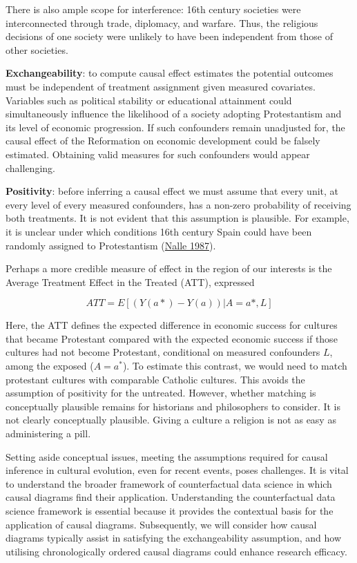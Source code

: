 \documentclass[
  singlecolumn]{report}
\begin{document}
There is also ample scope for interference: 16th century societies were
interconnected through trade, diplomacy, and warfare. Thus, the
religious decisions of one society were unlikely to have been
independent from those of other societies.

\textbf{Exchangeability}: to compute causal effect estimates the
potential outcomes must be independent of treatment assignment given
measured covariates. Variables such as political stability or
educational attainment could simultaneously influence the likelihood of
a society adopting Protestantism and its level of economic progression.
If such confounders remain unadjusted for, the causal effect of the
Reformation on economic development could be falsely estimated.
Obtaining valid measures for such confounders would appear challenging.

\textbf{Positivity}: before inferring a causal effect we must assume
that every unit, at every level of every measured confounders, has a
non-zero probability of receiving both treatments. It is not evident
that this assumption is plausible. For example, it is unclear under
which conditions 16th century Spain could have been randomly assigned to
Protestantism (\protect\hyperlink{ref-nalle1987}{Nalle 1987}).

Perhaps a more credible measure of effect in the region of our interests
is the Average Treatment Effect in the Treated (ATT), expressed

\[ATT = E[(Y(a*)- Y(a))|A = a*,L]\]

Here, the ATT defines the expected difference in economic success for
cultures that became Protestant compared with the expected economic
success if those cultures had not become Protestant, conditional on
measured confounders \(L\), among the exposed (\(A = a^*\)). To estimate
this contrast, we would need to match protestant cultures with
comparable Catholic cultures. This avoids the assumption of positivity
for the untreated. However, whether matching is conceptually plausible
remains for historians and philosophers to consider. It is not clearly
conceptually plausible. Giving a culture a religion is not as easy as
administering a pill.

Setting aside conceptual issues, meeting the assumptions required for
causal inference in cultural evolution, even for recent events, poses
challenges. It is vital to understand the broader framework of
counterfactual data science in which causal diagrams find their
application. Understanding the counterfactual data science framework is
essential because it provides the contextual basis for the application
of causal diagrams. Subsequently, we will consider how causal diagrams
typically assist in satisfying the exchangeability assumption, and how
utilising chronologically ordered causal diagrams could enhance research
efficacy.
\end{document}
